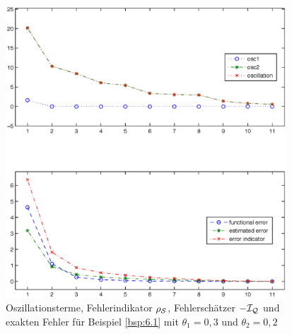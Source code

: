 \begin{bsp}
\begin{figure}[h]
\begin{center}
\includegraphics[width=10.5cm]{Abbildungen/adaptive_solution_example1.ps}
\end{center}
\caption[Diagramm mit dem Fehler und der Oszillation für Beispiel \ref{bsp:6.1}]{Oszillationsterme, Fehlerindikator $\rho_{\mathcal S}$, Fehlerschätzer $-\mathcal I_{\mathcal Q}$ und exakten Fehler für Beispiel \ref{bsp:6.1} mit $\theta_1=0,3$ und $\theta_2=0,2$\label{abb:6.3}}
\end{figure}
\end{bsp}


\newpage


